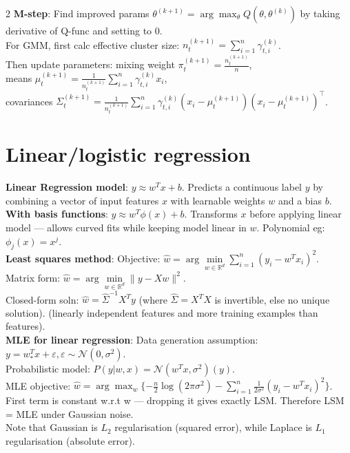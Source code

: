 \documentclass[10pt]{article}
\begin{document}
\begin{multicols*}{2}
\textbf{M-step}: Find improved params $\theta^{(k+1)} = \arg \max_\theta Q(\theta, \theta^{(k)})$ by taking derivative of Q-func and setting to 0.\\
For GMM, first calc effective cluster size: $n_t^{(k+1)} = \sum_{i=1}^n \gamma_{t,i}^{(k)}$.\\
Then update parameters: mixing weight $\pi_t^{(k+1)} = \frac{n_t^{(k+1)}}{n}$,\\
means $\mu_t^{(k+1)} = \frac{1}{n_t^{(k+1)}} \sum_{i=1}^n \gamma_{t,i}^{(k)} x_i$,\\
covariances $\Sigma_t^{(k+1)} = \frac{1}{n_t^{(k+1)}} \sum_{i=1}^n \gamma_{t,i}^{(k)} (x_i - \mu_t^{(k+1)})(x_i - \mu_t^{(k+1)})^\top$.

\section*{Linear/logistic regression}
\textbf{Linear Regression model}: $y \approx w^T x + b$.
Predicts a continuous label $y$ by combining a vector of input features $x$ with learnable weights $w$ and a bias $b$.\\
\textbf{With basis functions}: $y \approx w^T \phi(x) + b$.
Transforms $x$ before applying linear model — allows curved fits while keeping model linear in $w$. Polynomial eg: $\phi_j(x)=x^j$.\\
\textbf{Least squares method}: Objective: $\hat{w}=\arg\min\limits_{w\in\mathbb{R}^d}\sum\limits_{i=1}^n (y_i-w^T x_i)^2$.\\
Matrix form: $\hat{w} = \arg\min\limits_{w\in\mathbb{R}^d}\|y-Xw\|^2$.\\
Closed-form soln: $\hat{w} = \hat{\Sigma}^{-1} X^T y$ (where $\hat{\Sigma} = X^T X$ is invertible, else no unique solution).
(linearly independent features and more training examples than features).\\
\textbf{MLE for linear regression}: Data generation assumption: $y=w_*^T x+\varepsilon,\varepsilon\sim\mathcal{N}(0,\sigma^2)$.\\
Probabilistic model: $P(y|w,x) = \mathcal{N}(w^Tx,\sigma^2)(y)$.\\
MLE objective: $\hat{w} = \arg \max_w \{-\frac{n}{2}\log(2\pi\sigma^2) - \sum_{i=1}^n \frac{1}{2\sigma^2}(y_i - w^T x_i)^2\}$.\\
First term is constant w.r.t w — dropping it gives exactly LSM. Therefore LSM = MLE under Gaussian noise.\\
Note that Gaussian is $L_2$ regularisation (squared error), while Laplace is $L_1$ regularisation (absolute error).\\

\end{multicols*}
\end{document}
